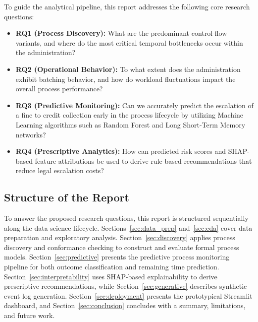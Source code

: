 To guide the analytical pipeline, this report addresses the following
core research questions:
\begin{itemize}
    \item \textbf{RQ1 (Process Discovery):} What are the predominant
        control-flow variants, and where do the most critical temporal
        bottlenecks occur within the administration?
    \item \textbf{RQ2 (Operational Behavior):} To what extent does the
        administration exhibit batching behavior, and how do workload
        fluctuations impact the overall process performance?
    \item \textbf{RQ3 (Predictive Monitoring):} Can we accurately
        predict the escalation of a fine to credit collection early in
        the process lifecycle by utilizing Machine Learning algorithms
        such as Random Forest and Long Short-Term Memory networks?
    \item \textbf{RQ4 (Prescriptive Analytics):} How can predicted
        risk scores and SHAP-based feature attributions be used to
        derive rule-based recommendations that reduce legal
        escalation costs?
\end{itemize}

\subsection{Structure of the Report}
\label{sub:structure}

To answer the proposed research questions, this report is structured
sequentially along the data science lifecycle.
Sections~\ref{sec:data_prep} and~\ref{sec:eda} cover data
preparation and exploratory analysis.
Section~\ref{sec:discovery} applies process discovery and conformance
checking to construct and evaluate formal process models.
Section~\ref{sec:predictive} presents the predictive process
monitoring pipeline for both outcome classification and remaining time
prediction. Section~\ref{sec:interpretability} uses SHAP-based
explainability to derive prescriptive recommendations, while
Section~\ref{sec:generative} describes synthetic event log generation.
Section~\ref{sec:deployment} presents the prototypical Streamlit
dashboard, and Section~\ref{sec:conclusion} concludes with a summary,
limitations, and future work.